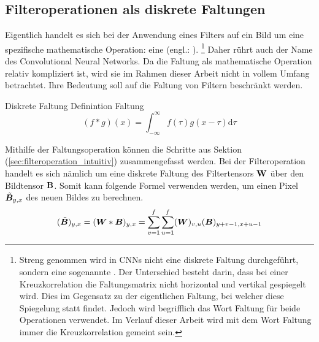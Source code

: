 \subsection{Filteroperationen als diskrete Faltungen}\label{sec:filteroperation_mathematisch}
Eigentlich handelt es sich bei der Anwendung eines Filters auf ein Bild um
eine spezifische mathematische Operation: eine  (engl.:
).
\footnote{
  Streng genommen wird in CNNs nicht eine diskrete Faltung durchgeführt, sondern
  eine sogenannte . Der Unterschied besteht darin, dass bei einer
  Kreuzkorrelation die Faltungsmatrix nicht horizontal und vertikal
  gespiegelt wird. Dies im Gegensatz zu der eigentlichen Faltung, bei welcher
  diese Spiegelung statt findet. Jedoch wird
  begrifflich das Wort Faltung für beide Operationen verwendet. Im Verlauf dieser Arbeit
  wird mit dem Wort Faltung immer die Kreuzkorrelation gemeint sein.
}
Daher rührt auch der Name des Convolutional Neural Networks.
Da die Faltung als mathematische Operation relativ kompliziert ist, wird sie im
Rahmen dieser Arbeit nicht in vollem Umfang betrachtet.
Ihre Bedeutung soll auf die Faltung von Filtern beschränkt werden.
\para{}
\begin{defbox}{Diskrete Faltung}
  Definintion Faltung
  \begin{equation}
    (f * g)(x) = \int_{-\infty}^{\infty} f(\tau) g(x-\tau) \text{d}\tau
  \end{equation}
\end{defbox}
\para{}
Mithilfe der Faltungsoperation können die Schritte aus Sektion
(\ref{sec:filteroperation_intuitiv}) zusammengefasst werden.
Bei der Filteroperation handelt es sich nämlich um eine diskrete Faltung des
Filtertensors $\mathbf{W}$ über den Bildtensor $\mathbf{B}$. Somit kann
folgende Formel verwenden werden, um einen Pixel $\tilde{\bm{B}}_{y,x}$ des neuen Bildes zu berechnen.
\\
\begin{equation}
  (\tilde{\bm{B}})_{y,x} = (\bm{W} * \bm{B})_{y,x} = \sum_{v=1}^{f} \sum_{u=1}^{f} (\bm{W})_{v,u}(\bm{B})_{y+v-1,x+u-1}
\end{equation}
\para{}
